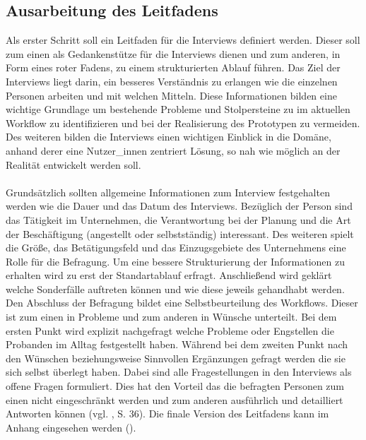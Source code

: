 \documentclass[Bachelorarbeit.tex]{subfiles}
\begin{document}
\subsection{Ausarbeitung des Leitfadens}

Als erster Schritt soll ein Leitfaden für die Interviews definiert werden. 
Dieser soll zum einen als Gedankenstütze für die Interviews dienen und zum anderen, in Form eines roter Fadens, zu einem strukturierten Ablauf führen.
Das Ziel der Interviews liegt darin, ein besseres Verständnis zu erlangen wie die einzelnen Personen arbeiten und mit welchen Mitteln.
Diese Informationen bilden eine wichtige Grundlage um bestehende Probleme und Stolpersteine zu im aktuellen Workflow zu identifizieren und bei der Realisierung des Prototypen zu vermeiden. 
Des weiteren bilden die Interviews einen wichtigen Einblick in die Domäne, anhand derer eine Nutzer\_innen zentriert Lösung, so nah wie möglich an der Realität entwickelt werden soll.\\
\\
Grundsätzlich sollten allgemeine Informationen zum Interview festgehalten werden wie die Dauer und das Datum des Interviews.
Bezüglich der Person sind das Tätigkeit im Unternehmen, die Verantwortung bei der Planung und die Art der Beschäftigung (angestellt oder selbstständig) interessant.
Des weiteren spielt die Größe, das Betätigungsfeld und das Einzugsgebiete des Unternehmens eine Rolle für die Befragung.
Um eine bessere Strukturierung der Informationen zu erhalten wird zu erst der Standartablauf erfragt. 
Anschließend wird geklärt welche Sonderfälle auftreten können und wie diese jeweils gehandhabt werden.
Den Abschluss der Befragung bildet eine Selbstbeurteilung des Workflows. 
Dieser ist zum einen in Probleme und zum anderen in Wünsche unterteilt.
Bei dem ersten Punkt wird explizit nachgefragt welche Probleme oder Engstellen die Probanden im Alltag festgestellt haben.
Während bei dem zweiten Punkt nach den Wünschen beziehungsweise Sinnvollen Ergänzungen gefragt werden die sie sich selbst überlegt haben. 
Dabei sind alle Fragestellungen in den Interviews als offene Fragen formuliert. 
Dies hat den Vorteil das die befragten Personen zum einen nicht eingeschränkt werden und zum anderen ausführlich und detailliert Antworten können (vgl. \cite{Mayer2006}, S. 36).
Die finale Version des Leitfadens kann im Anhang eingesehen werden (). 
\end{document}
